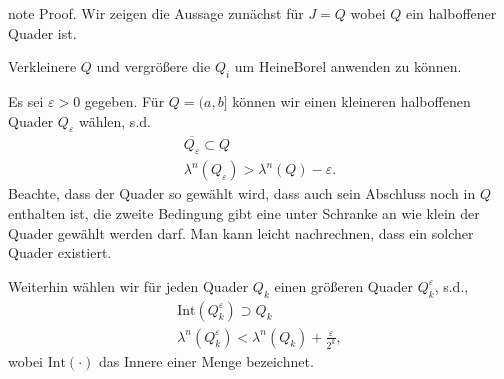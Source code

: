 \documentclass[letterpaper,10pt,german]{jupyterBook}
\begin{document}
\begin{sphinxadmonition}{note}
\sphinxAtStartPar
Proof. Wir zeigen die Aussage zunächst für \(J=Q\) wobei \(Q\) ein halboffener Quader ist.

\sphinxAtStartPar
{} Verkleinere \(Q\) und vergrößere die \(Q_i\) um Heine\sphinxhyphen{}Borel anwenden zu können.

\sphinxAtStartPar
Es sei \(\varepsilon>0\) gegeben. Für \(Q=(a,b]\) können wir einen kleineren halboffenen Quader \(Q_\varepsilon\) wählen, s.d.
\begin{equation*}
\begin{split}\overline{Q_\varepsilon} \subset Q\\
\lambda^n(Q_\varepsilon) > \lambda^n(Q) - \varepsilon.\end{split}
\end{equation*}
\sphinxAtStartPar
Beachte, dass der Quader so gewählt wird, dass auch sein Abschluss noch in \(Q\) enthalten ist, die zweite Bedingung gibt eine unter Schranke an wie klein der Quader gewählt werden darf. Man kann leicht nachrechnen, dass ein solcher Quader existiert.

\sphinxAtStartPar
Weiterhin wählen wir für jeden Quader \(Q_k\) einen größeren Quader \(Q_k^\varepsilon\), s.d.,
\begin{equation*}
\begin{split}\text{Int}(Q_k^\varepsilon)\supset Q_k\\
\lambda^n(Q_k^\varepsilon) < \lambda^n(Q_k) + \frac{\varepsilon}{2^k},\end{split}
\end{equation*}
\sphinxAtStartPar
wobei \(\text{Int}(\cdot)\) das Innere einer Menge bezeichnet.


\end{sphinxadmonition}
\end{document}

